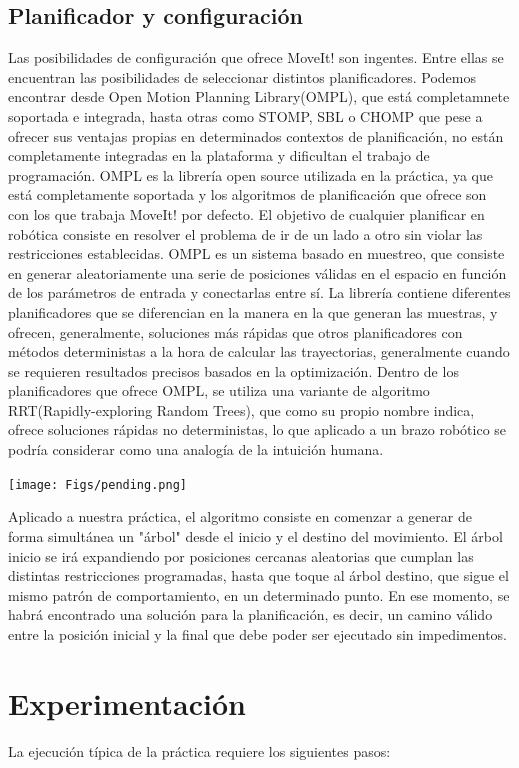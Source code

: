 \documentclass[12pt,spanish,chapterprefix, numbers=noenddot]{book}
\numberwithin{equation}{section}
\numberwithin{figure}{section}
\begin{document}
\subsection{Planificador y configuración}
Las posibilidades de configuración que ofrece MoveIt! son ingentes. Entre ellas se encuentran las posibilidades de seleccionar distintos planificadores. Podemos encontrar desde Open Motion Planning Library(OMPL), que está completamnete soportada e integrada, hasta otras como STOMP, SBL o CHOMP que pese a ofrecer sus ventajas propias en determinados contextos de planificación, no están completamente integradas en la plataforma y dificultan el trabajo de programación. 
OMPL es la librería open source utilizada en la práctica, ya que está completamente soportada y los algoritmos de planificación que ofrece son con los que trabaja MoveIt! por defecto. \cite{moveit_planners}
El objetivo de cualquier planificar en robótica consiste en resolver el problema de ir de un lado a otro sin violar las restricciones establecidas. OMPL es un sistema basado en muestreo, que consiste en generar aleatoriamente una serie de posiciones válidas en el espacio en función de los parámetros de entrada y conectarlas entre sí.
La librería contiene diferentes planificadores que se diferencian en la manera en la que generan las muestras, y ofrecen, generalmente, soluciones más rápidas que otros planificadores con métodos deterministas  a la hora de calcular las trayectorias, generalmente cuando se requieren resultados precisos basados en la optimización.
Dentro de los planificadores que ofrece OMPL, se utiliza una variante de algoritmo RRT(Rapidly-exploring Random Trees), que como su propio nombre indica, ofrece soluciones rápidas no deterministas, lo que aplicado a un brazo robótico se podría considerar como una analogía de la intuición humana. 
\begin{center}
\texttt{[image: Figs/pending.png]}
\end{center}
Aplicado a nuestra práctica, el algoritmo consiste en comenzar a generar de forma simultánea un "árbol" desde el inicio y el destino del movimiento. El árbol inicio se irá expandiendo por posiciones cercanas aleatorias que cumplan las distintas restricciones programadas, hasta que toque al árbol destino, que sigue el mismo patrón de comportamiento, en un determinado punto. En ese momento, se habrá encontrado una solución para la planificación, es decir, un camino válido entre la posición inicial y la final que debe poder ser ejecutado sin impedimentos.

\section{Experimentación}
La ejecución típica de la práctica requiere los siguientes pasos: 
\end{document}
